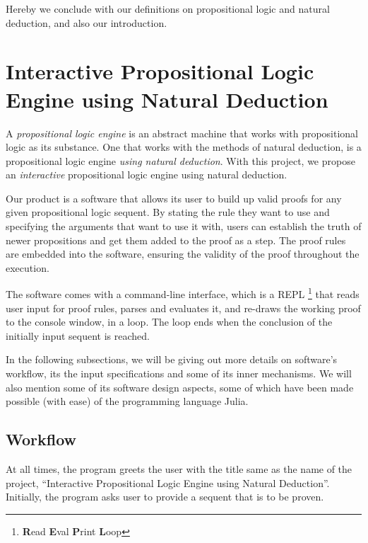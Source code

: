 \documentclass{article}
\begin{document}
Hereby we conclude with our definitions on propositional logic
and natural deduction, and also our introduction.

\section{Interactive Propositional Logic Engine using Natural Deduction}

A \textit{propositional logic engine} is an abstract machine that
works with propositional logic as its substance. One that works
with the methods of natural deduction, is a propositional logic
engine \textit{using natural deduction}. With this project,
we propose an \textit{interactive} propositional logic engine
using natural deduction.

Our product is a software that allows its user to build up valid proofs
for any given propositional logic sequent. By stating the rule they
want to use and specifying the arguments that want to use it with,
users can establish the truth of newer propositions and get them added
to the proof as a step. The proof rules are embedded into the software,
ensuring the validity of the proof throughout the execution.

The software comes with a command-line interface, which is a REPL%
\footnote{\textbf{R}ead \textbf{E}val \textbf{P}rint \textbf{L}oop}
that reads user input for proof rules, parses and evaluates it, and
re-draws the working proof to the console window, in a loop. The
loop ends when the conclusion of the initially input sequent is reached.

In the following subsections, we will be giving out more details on
software's workflow, its the input specifications and some of its
inner mechanisms. We will also mention some of its software design
aspects, some of which have been made possible (with ease) of the
programming language Julia.

\subsection{Workflow}

At all times, the program greets the user with the title same as the
name of the project, ``Interactive Propositional Logic Engine using
Natural Deduction''. Initially, the program asks user to provide
a sequent that is to be proven.
\end{document}
